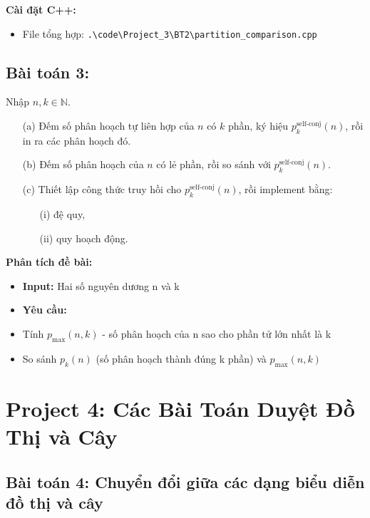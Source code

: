 \documentclass[12pt,a4paper]{article}
\begin{document}
\textbf{Cài đặt C++:}
\begin{itemize}[label=\textbullet]
   \item File tổng hợp: \texttt{.\textbackslash code\textbackslash Project\_3\textbackslash BT2\textbackslash partition\_comparison.cpp}
\end{itemize}

\subsection{Bài toán 3:}

\begin{problembox}
Nhập $n, k \in \mathbb{N}$.
\begin{enumerate}
    \item[(a)] Đếm số phân hoạch tự liên hợp của $n$ có $k$ phần, ký hiệu $p_k^{\text{self-conj}}(n)$, rồi in ra các phân hoạch đó.
    \item[(b)] Đếm số phân hoạch của $n$ có lẻ phần, rồi so sánh với $p_k^{\text{self-conj}}(n)$.
    \item[(c)] Thiết lập công thức truy hồi cho $p_k^{\text{self-conj}}(n)$, rồi implement bằng:
    \begin{enumerate}
        \item[(i)] đệ quy,
        \item[(ii)] quy hoạch động.
    \end{enumerate}
\end{enumerate}


\textbf{Phân tích đề bài:}


\begin{itemize}[label=\textbullet]
    \item \textbf{Input:} Hai số nguyên dương n và k
    \item \textbf{Yêu cầu:}
    \item Tính $p_{\max}(n, k)$ - số phân hoạch của n sao cho phần tử lớn nhất là k
    \item So sánh $p_k(n)$ (số phân hoạch thành đúng k phần) và $p_{\max}(n, k)$

\end{itemize}

\end{problembox}

\section{Project 4: Các Bài Toán Duyệt Đồ Thị và Cây}

\subsection{Bài toán 4: Chuyển đổi giữa các dạng biểu diễn đồ thị và cây}
\end{document}
